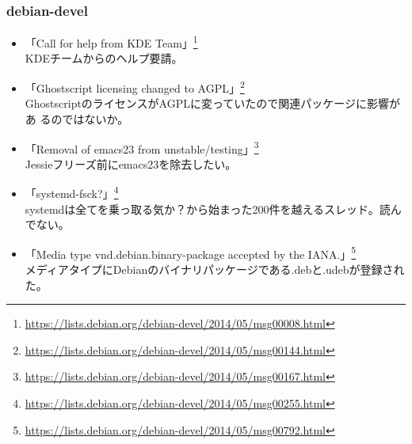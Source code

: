 \documentclass[mingoth,a4paper]{jsarticle}
\begin{document}
\subsubsection{debian-devel}
\begin{itemize}
\item 「Call for help from KDE Team」\footnote{\url{https://lists.debian.org/debian-devel/2014/05/msg00008.html}}\\
  KDEチームからのヘルプ要請。

\item 「Ghostscript licensing changed to AGPL」\footnote{\url{https://lists.debian.org/debian-devel/2014/05/msg00144.html}}\\
  GhostscriptのライセンスがAGPLに変っていたので関連パッケージに影響があ
  るのではないか。

\item 「Removal of emacs23 from unstable/testing」\footnote{\url{https://lists.debian.org/debian-devel/2014/05/msg00167.html}}\\
  Jessieフリーズ前にemacs23を除去したい。

\item 「systemd-fsck?」\footnote{\url{https://lists.debian.org/debian-devel/2014/05/msg00255.html}}\\
  systemdは全てを乗っ取る気か？から始まった200件を越えるスレッド。読んでない。

\item 「Media type vnd.debian.binary-package accepted by the IANA.」\footnote{\url{https://lists.debian.org/debian-devel/2014/05/msg00792.html}}\\
  メディアタイプにDebianのバイナリパッケージである.debと.udebが登録された。


\end{itemize}
\end{document}
